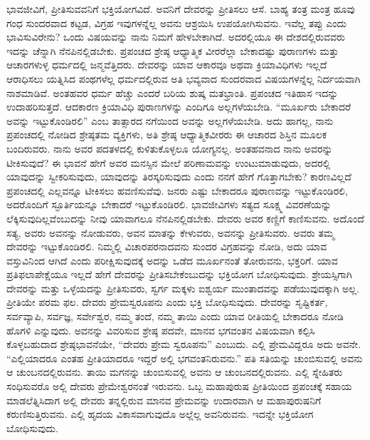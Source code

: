 ಭಾವಜೀವಿಗೆ, ಪ್ರೀತಿಸುವವನಿಗೆ ಭಕ್ತಿಯೋಗವಿದೆ. ಅವನಿಗೆ ದೇವರನ್ನು ಪ್ರೀತಿಸಲು ಆಸೆ. ಬಾಹ್ಯ ತಂತ್ರ ಮಂತ್ರ ಹೂವು ಗಂಧ ಸುಂದರವಾದ ಕಟ್ಟಡ, ವಿಗ್ರಹ ಇವುಗಳನ್ನೆಲ್ಲ ಅವನು ಆಶ್ರಯಿಸಿ ಉಪಯೋಗಿಸುವನು. ಇವೆಲ್ಲ ತಪ್ಪು ಎಂದು ಭಾವಿಸುವಿರೇನು? ಒಂದು ವಿಷಯವನ್ನು ನಾನು ನಿಮಗೆ ಹೇಳಬೇಕಾಗಿದೆ. ಅದರಲ್ಲಿಯೂ ಈ ದೇಶದಲ್ಲಿರುವವರು ಇದನ್ನು ಚೆನ್ನಾಗಿ ನೆನಪಿನಲ್ಲಿಡಬೇಕು. ಪ್ರಪಂಚದ ಶ್ರೇಷ್ಠ ಆಧ್ಯಾತ್ಮಿಕ ವೀರರೆಲ್ಲಾ ಬೇಕಾದಷ್ಟು ಪುರಾಣಗಳು ಮತ್ತು ಆಚಾರಗಳುಳ್ಳ ಧರ್ಮದಲ್ಲಿ ಜನ್ಮವೆತ್ತಿದರು. ದೇವರನ್ನು ಯಾವ ಆಕಾರವೂ ಅಥವಾ ಕ್ರಿಯಾವಿಧಿಗಳು ಇಲ್ಲದೆ ಆರಾಧಿಸಲು ಯತ್ನಿಸಿದ ಪಂಥಗಳೆಲ್ಲ ಧರ್ಮದಲ್ಲಿರುವ ಅತಿ ಭವ್ಯವಾದ ಸುಂದರವಾದ ವಿಷಯಗಳನ್ನೆಲ್ಲ ನಿರ್ದಯವಾಗಿ ನಾಶಮಾಡಿವೆ. ಅಂತಹವರ ಧರ್ಮ ಹೆಚ್ಚು ಎಂದರೆ ಬರಿಯ ಶುಷ್ಕ ಮತಭ್ರಾಂತಿ. ಪ್ರಪಂಚದ ಇತಿಹಾಸ ಇದನ್ನು ಉದಾಹರಿಸುತ್ತದೆ. ಆದಕಾರಣ ಕ್ರಿಯಾವಿಧಿ ಪುರಾಣಗಳನ್ನು ಎಂದಿಗೂ ಅಲ್ಲಗಳೆಯಬೇಡಿ. “ಮೂರ್ಖರು ಬೇಕಾದರೆ ಅವನ್ನು ಇಟ್ಟುಕೊಂಡಿರಲಿ” ಎಂಬ ತಾತ್ಸಾರದ ನಗೆಯಿಂದ ಅವನ್ನು ಅಲ್ಲಗಳೆಯಬೇಡಿ. ಅದು ಹಾಗಲ್ಲ, ನಾನು ಪ್ರಪಂಚದಲ್ಲಿ ನೋಡಿದ ಶ್ರೇಷ್ಠತಮ ವ್ಯಕ್ತಿಗಳು, ಅತಿ ಶ್ರೇಷ್ಠ ಆಧ್ಯಾತ್ಮಿಕವೀರರು ಈ ಆಚಾರದ ಶಿಸ್ತಿನ ಮೂಲಕ ಬಂದಿರುವರು. ನಾನು ಅವರ ಪದತಳದಲ್ಲಿ ಕುಳಿತುಕೊಳ್ಳಲೂ ಯೋಗ್ಯನಲ್ಲ. ಅಂತಹವನಾದ ನಾನು ಅವರನ್ನು ಟೀಕಿಸುವುದೆ? ಈ ಭಾವನೆ ಹೇಗೆ ಅವರ ಮನಸ್ಸಿನ ಮೇಲೆ ಪರಿಣಾಮವನ್ನು ಉಂಟುಮಾಡುವುದು, ಅದರಲ್ಲಿ ಯಾವುದನ್ನು ಸ್ವೀಕರಿಸುವುದು, ಯಾವುದನ್ನು ತಿರಸ್ಕರಿಸುವುದು ಎಂದು ನನಗೆ ಹೇಗೆ ಗೊತ್ತಾಗಬೇಕು? ಕಾರಣವಿಲ್ಲದೆ ಪ್ರಪಂಚದಲ್ಲಿ ಎಲ್ಲವನ್ನೂ ಟೀಕಿಸಲು ಹವಣಿಸುವೆವು. ಜನರು ಎಷ್ಟು ಬೇಕಾದರೂ ಪುರಾಣವನ್ನು ಇಟ್ಟುಕೊಂಡಿರಲಿ, ಅದರೊಂದಿಗೆ ಸ್ಫೂರ್ತಿಯನ್ನೂ ಬೇಕಾದರೆ ಇಟ್ಟುಕೊಂಡಿರಲಿ. ಭಾವಜೀವಿಗಳು ಸತ್ಯದ ಸೂಕ್ಷ್ಮ ವಿವರಣೆಯನ್ನು ಲೆಕ್ಕಿಸುವುದಿಲ್ಲವೆಂಬುದನ್ನು ನೀವು ಯಾವಾಗಲೂ ನೆನಪಿನಲ್ಲಿಡಬೇಕು. ದೇವರು ಅವರ ಕಣ್ಣಿಗೆ ಕಾಣಿಸುವನು. ಅದೊಂದೆ ಸತ್ಯ, ಅವರು ಅವನನ್ನು ನೋಡುವರು, ಅವನ ಮಾತನ್ನು ಕೇಳುವರು, ಅವನನ್ನು ಪ್ರೀತಿಸುವರು. ಅವರು ತಮ್ಮ ದೇವರನ್ನು ಇಟ್ಟುಕೊಂಡಿರಲಿ. ನಿಮ್ಮಲ್ಲಿ ವಿಚಾರಪರನಾದವನು ಸುಂದರ ವಿಗ್ರಹವನ್ನು ನೋಡಿ, ಅದು ಯಾವ ವಸ್ತುವಿನಿಂದ ಆಗಿದೆ ಎಂದು ಪರೀಕ್ಷಿಸುವುದಕ್ಕೆ ಅದನ್ನು ಒಡೆದ ಮೂರ್ಖನಂತೆ ತೋರುವನು, ಭಕ್ತರಿಗೆ. ಯಾವ ಪ್ರತಿಫಲಾಪೇಕ್ಷೆಯೂ ಇಲ್ಲದೆ ಹೇಗೆ ದೇವರನ್ನು ಪ್ರೀತಿಸಬೇಕೆಂಬುದನ್ನು ಭಕ್ತಿಯೋಗ ಬೋಧಿಸುವುದು. ಶ್ರೇಯಸ್ಸಿಗಾಗಿ ದೇವರನ್ನು ಮತ್ತು ಒಳ್ಳೆಯದನ್ನು ಪ್ರೀತಿಸುವರು, ಸ್ವರ್ಗ ಮಕ್ಕಳು ಐಶ್ವರ್ಯ ಮುಂತಾದವನ್ನು ಪಡೆಯುವುದಕ್ಕಾಗಿ ಅಲ್ಲ. ಪ್ರೀತಿಯೇ ಪರಮ ಫಲ. ದೇವರು ಪ್ರೇಮಸ್ವರೂಪನು ಎಂದು ಭಕ್ತಿ ಬೋಧಿಸುವುದು. ದೇವರನ್ನು ಸೃಷ್ಟಿಕರ್ತ, ಸರ್ವವ್ಯಾಪಿ, ಸರ್ವಜ್ಞ, ಸರ್ವೇಶ್ವರ, ನಮ್ಮ ತಂದೆ, ನಮ್ಮ ತಾಯಿ ಎಂದು ಯಾವ ರೀತಿಯಲ್ಲಿ ಬೇಕಾದರೂ ನೋಡಿ ಹೊಗಳಿ ಎನ್ನುವುದು. ಅವನನ್ನು ವಿವರಿಸುವ ಶ್ರೇಷ್ಠ ಪದವೇ, ಮಾನವ ಭಗವಂತನ ವಿಷಯವಾಗಿ ಕಲ್ಪಿಸಿ ಕೊಳ್ಳಬಹುದಾದ ಶ್ರೇಷ್ಠಭಾವನೆಯೇ, “ದೇವರು ಪ್ರೇಮ ಸ್ವರೂಪನು” ಎಂಬುದು. ಎಲ್ಲಿ ಪ್ರೇಮವಿದ್ದರೂ ಅದು ಅವನೇ. “ಎಲ್ಲಿಯಾದರೂ ಎಂತಹ ಪ್ರೀತಿಯಾದರೂ ಇದ್ದರೆ ಅಲ್ಲಿ ಭಗವಂತನಿರುವನು.” ಪತಿ ಸತಿಯನ್ನು ಚುಂಬಿಸುವಲ್ಲಿ ಅವನು ಆ ಚುಂಬನದಲ್ಲಿರುವನು. ತಾಯಿ ಮಗನನ್ನು ಚುಂಬಿಸುವಲ್ಲಿ ಅವನು ಆ ಚುಂಬನದಲ್ಲಿರುವನು. ಎಲ್ಲಿ ಸ್ನೇಹಿತರು ಸಂಧಿಸುವರೊ ಅಲ್ಲಿ ದೇವರು ಪ್ರೇಮೇಶ್ವರನಂತೆ ಇರುವನು. ಒಬ್ಬ ಮಹಾಪುರುಷ ಪ್ರೀತಿಯಿಂದ ಪ್ರಪಂಚಕ್ಕೆ ಸಹಾಯ ಮಾಡಲೆತ್ನಿಸಿದಾಗ ಅಲ್ಲಿ ದೇವರು ತನ್ನಲ್ಲಿರುವ ಮಾನವ ಪ್ರೇಮವನ್ನು ಉದಾರವಾಗಿ ಆ ಮಹಾಪುರುಷನಿಗೆ ಕರುಣಿಸುತ್ತಿರುವನು. ಎಲ್ಲಿ ಹೃದಯ ವಿಕಾಸವಾಗುವುದೊ ಅಲ್ಲೆಲ್ಲ ಅವನಿರುವನು. ಇದನ್ನೇ ಭಕ್ತಿಯೋಗ ಬೋಧಿಸುವುದು.

